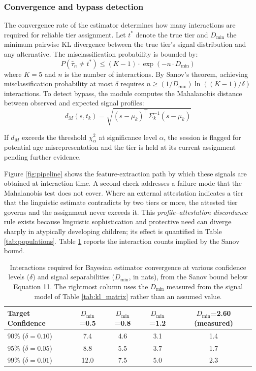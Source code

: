 \documentclass[fleqn,10pt]{wlscirep}
\begin{document}
\subsubsection*{Convergence and bypass detection}

The convergence rate of the estimator determines how many interactions are required for reliable tier assignment. Let $t^*$ denote the true tier and $D_{\min}$ the minimum pairwise KL divergence between the true tier's signal distribution and any alternative. The misclassification probability is bounded by:
\begin{equation}
P(\hat{\tau}_n \neq t^*) \leq (K - 1) \cdot \exp(-n \cdot D_{\min})
\end{equation}
where $K = 5$ and $n$ is the number of interactions. By Sanov's theorem, achieving misclassification probability at most $\delta$ requires $n \geq (1/D_{\min}) \ln((K - 1)/\delta)$ interactions. To detect bypass, the module computes the Mahalanobis distance between observed and expected signal profiles:
\begin{equation}
d_M(s, t_k) = \sqrt{(s - \mu_k)^\top \Sigma_k^{-1} (s - \mu_k)}
\end{equation}

If $d_M$ exceeds the threshold $\chi^2_\alpha$ at significance level $\alpha$, the session is flagged for potential age misrepresentation and the tier is held at its current assignment pending further evidence.

Figure \ref{fig:pipeline} shows the feature-extraction path by which these signals are obtained at interaction time. A second check addresses a failure mode that the Mahalanobis test does not cover. Where an external attestation indicates a tier that the linguistic estimate contradicts by two tiers or more, the attested tier governs and the assignment never exceeds it. This \emph{profile--attestation discordance} rule exists because linguistic sophistication and protective need can diverge sharply in atypically developing children; its effect is quantified in Table \ref{tab:populations}. Table \ref{tab:convergence} reports the interaction counts implied by the Sanov bound.

\begin{table}[H]
\centering
\caption{Interactions required for Bayesian estimator convergence at various confidence levels ($\delta$) and signal separabilities ($D_{\min}$, in nats), from the Sanov bound below Equation 11. The rightmost column uses the $D_{\min}$ measured from the signal model of Table \ref{tab:kl_matrix} rather than an assumed value.}
\label{tab:convergence}
\begin{tabular}{lcccc}
\hline
\textbf{Target Confidence} & $D_{\min}$\textbf{=0.5} & $D_{\min}$\textbf{=0.8} & $D_{\min}$\textbf{=1.2} & $D_{\min}$\textbf{=2.60 (measured)} \\
\hline
90\% ($\delta = 0.10$) & 7.4 & 4.6 & 3.1 & 1.4 \\
95\% ($\delta = 0.05$) & 8.8 & 5.5 & 3.7 & 1.7 \\
99\% ($\delta = 0.01$) & 12.0 & 7.5 & 5.0 & 2.3 \\
\hline
\end{tabular}
\end{table}
\end{document}

